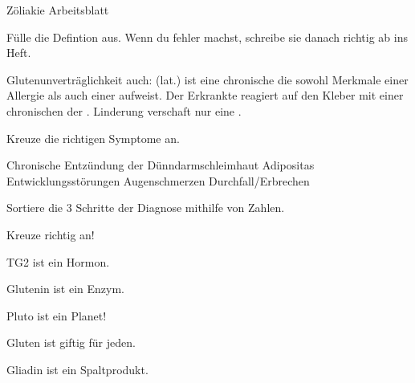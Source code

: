\documentclass[11pt,twoside,a4paper]{exam}
\begin{document}
\begin{center}
  \huge{Z\"oliakie Arbeitsblatt}
\end{center}
\begin{center}
\end{center}
\vspace{0.1in}

\begin{questions}
\question F\"ulle die Defintion aus. Wenn du fehler machst, schreibe sie danach richtig ab ins Heft.

Glutenunvertr\"aglichkeit auch: \fillin(lat.) ist eine chronische \fillin die sowohl Merkmale einer Allergie als auch einer \fillin aufweist.
Der Erkrankte reagiert \fillin auf den Kleber \fillin mit einer chronischen \fillin der \fillin. Linderung verschaft
nur eine \fillin.



\question
  Kreuze die richtigen Symptome an.
  \begin{checkboxes}
\choice Chronische Entz\"undung der D\"unndarmschleimhaut
\choice Adipositas
\choice Entwicklungsstörungen
\choice Augenschmerzen
\choice Durchfall/Erbrechen
  \end{checkboxes}



  \question Sortiere die 3 Schritte der Diagnose mithilfe von Zahlen.
  
  \begin{oneparcheckboxes}
  \end{oneparcheckboxes}


\question Kreuze richtig an!
\begin{questions}
  \question TG2 ist ein Hormon.
    \begin{oneparcheckboxes}
  \end{oneparcheckboxes}
   \question Glutenin ist ein Enzym.
    \begin{oneparcheckboxes}
  \end{oneparcheckboxes}
  \question Pluto ist ein Planet!
   \begin{oneparcheckboxes}
  \end{oneparcheckboxes}
  \question Gluten ist giftig f\"ur jeden.
   \begin{oneparcheckboxes}
  \end{oneparcheckboxes}
  \question Gliadin ist ein Spaltprodukt.
      \begin{oneparcheckboxes}
  \end{oneparcheckboxes}
\end{questions}


\end{questions}
\end{document}
